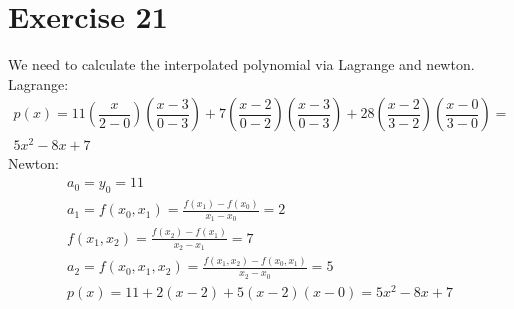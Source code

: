 \section{Exercise 21}
We need to calculate the interpolated polynomial via Lagrange and newton.\\
Lagrange:
\begin{gather*}
p(x) = 11 \left(\dfrac{x}{2-0} \right) \left( \dfrac{x-3}{0-3}\right) + 7 \left( \dfrac{x-2}{0-2} \right) \left( \dfrac{x-3}{0-3} \right) + 28 \left( \dfrac{x-2}{3-2} \right) \left( \dfrac{x-0}{3-0} \right) = \\
5x^2 - 8x + 7 
\end{gather*}
Newton:
\begin{gather*}
a_0 = y_0 = 11\\
a_1 = f(x_0,x_1) = \frac{f(x_1) - f(x_0)}{x_1 -x_0} = 2\\
f(x_1,x_2) = \frac{f(x_2) - f(x_1)}{x_2 -x_1} = 7\\
a_2 = f(x_0,x_1,x_2) = \frac{f(x_1,x_2)-f(x_0,x_1)}{x_2 - x_0} = 5\\
p(x) = 11 + 2(x-2) + 5( x-2)(x-0) = 5x^2 -8x + 7 
\end{gather*}